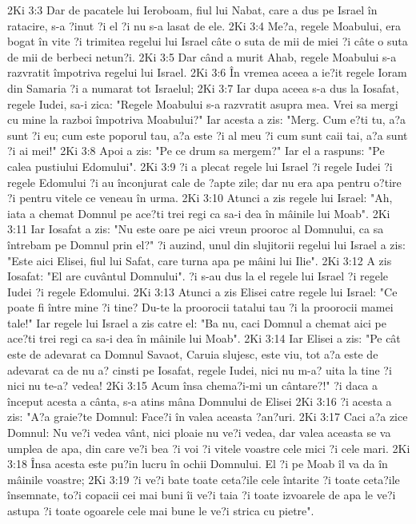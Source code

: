 2Ki 3:3  Dar de pacatele lui Ieroboam, fiul lui Nabat, care a dus pe Israel în ratacire, s-a ?inut ?i el ?i nu s-a lasat de ele.
2Ki 3:4  Me?a, regele Moabului, era bogat în vite ?i trimitea regelui lui Israel câte o suta de mii de miei ?i câte o suta de mii de berbeci netun?i.
2Ki 3:5  Dar când a murit Ahab, regele Moabului s-a razvratit împotriva regelui lui Israel.
2Ki 3:6  În vremea aceea a ie?it regele Ioram din Samaria ?i a numarat tot Israelul;
2Ki 3:7  Iar dupa aceea s-a dus la Iosafat, regele Iudei, sa-i zica: "Regele Moabului s-a razvratit asupra mea. Vrei sa mergi cu mine la razboi împotriva Moabului?" Iar acesta a zis: "Merg. Cum e?ti tu, a?a sunt ?i eu; cum este poporul tau, a?a este ?i al meu ?i cum sunt caii tai, a?a sunt ?i ai mei!"
2Ki 3:8  Apoi a zis: "Pe ce drum sa mergem?" Iar el a raspuns: "Pe calea pustiului Edomului".
2Ki 3:9  ?i a plecat regele lui Israel ?i regele Iudei ?i regele Edomului ?i au înconjurat cale de ?apte zile; dar nu era apa pentru o?tire ?i pentru vitele ce veneau în urma.
2Ki 3:10  Atunci a zis regele lui Israel: "Ah, iata a chemat Domnul pe ace?ti trei regi ca sa-i dea în mâinile lui Moab".
2Ki 3:11  Iar Iosafat a zis: "Nu este oare pe aici vreun prooroc al Domnului, ca sa întrebam pe Domnul prin el?" ?i auzind, unul din slujitorii regelui lui Israel a zis: "Este aici Elisei, fiul lui Safat, care turna apa pe mâini lui Ilie".
2Ki 3:12  A zis Iosafat: "El are cuvântul Domnului". ?i s-au dus la el regele lui Israel ?i regele Iudei ?i regele Edomului.
2Ki 3:13  Atunci a zis Elisei catre regele lui Israel: "Ce poate fi între mine ?i tine? Du-te la proorocii tatalui tau ?i la proorocii mamei tale!" Iar regele lui Israel a zis catre el: "Ba nu, caci Domnul a chemat aici pe ace?ti trei regi ca sa-i dea în mâinile lui Moab".
2Ki 3:14  Iar Elisei a zis: "Pe cât este de adevarat ca Domnul Savaot, Caruia slujesc, este viu, tot a?a este de adevarat ca de nu a? cinsti pe Iosafat, regele Iudei, nici nu m-a? uita la tine ?i nici nu te-a? vedea!
2Ki 3:15  Acum însa chema?i-mi un cântare?!" ?i daca a început acesta a cânta, s-a atins mâna Domnului de Elisei
2Ki 3:16  ?i acesta a zis: "A?a graie?te Domnul: Face?i în valea aceasta ?an?uri.
2Ki 3:17  Caci a?a zice Domnul: Nu ve?i vedea vânt, nici ploaie nu ve?i vedea, dar valea aceasta se va umplea de apa, din care ve?i bea ?i voi ?i vitele voastre cele mici ?i cele mari.
2Ki 3:18  Însa acesta este pu?in lucru în ochii Domnului. El ?i pe Moab îl va da în mâinile voastre;
2Ki 3:19  ?i ve?i bate toate ceta?ile cele întarite ?i toate ceta?ile însemnate, to?i copacii cei mai buni îi ve?i taia ?i toate izvoarele de apa le ve?i astupa ?i toate ogoarele cele mai bune le ve?i strica cu pietre".
